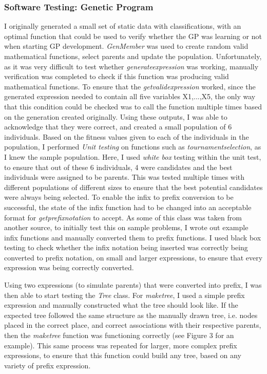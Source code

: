 \documentclass[11pt]{article}
\begin{document}
\subsubsection{Software Testing: Genetic Program}\label{subsubsec:STGP}
I originally generated a small set of static data with classifications, with an optimal function that could be used to verify whether the GP was learning or not when starting GP development.
\textit{GenMember} was used to create random valid mathematical functions, select parents and update the population. Unfortunately, as it was very difficult to test whether \textit{generate\textunderscore expression} was working, manually verification was completed to check if this function was producing valid mathematical functions. To ensure that the \textit{get\textunderscore valid\textunderscore expression} worked, since the generated expression needed to contain all five variables X1,...,X5, the only way that this condition could be checked was to call the function multiple times based on the generation created originally. Using these outputs, I was able to acknowledge that they were correct, and created a small population of 6 individuals. Based on the fitness values given to each of the individuals in the population, I performed \textit{Unit testing} on functions such as \textit{tournament\textunderscore selection}, as I knew the sample population. Here, I used \textit{white box} testing within the unit test, to ensure that out of these 6 individuals, 4 were candidates and the best individuals were assigned to be parents. This was tested multiple times with different populations of different sizes to ensure that the best potential candidates were always being selected. 
To enable the infix to prefix conversion to be successful, the state of the infix function had to be changed into an acceptable format for \textit{get\textunderscore prefix\textunderscore notation} to accept. As some of this class was taken from another source, to initially test this on sample problems, I wrote out example infix functions and manually converted them to prefix functions. I used black box testing to check whether the infix notation being inserted was correctly being converted to prefix notation, on small and larger expressions, to ensure that every expression was being correctly converted. 

Using two expressions (to simulate parents) that were converted into prefix, I was then able to start testing the \textit{Tree} class. For \textit{make\textunderscore tree}, I used a simple prefix expression
and manually constructed what the tree should look like. If the expected tree followed the same structure as the manually drawn tree, i.e. nodes placed in the correct place, and correct associations with their respective parents, then the \textit{make\textunderscore tree} function was functioning correctly (see Figure 3 for an example).  This same process was repeated for larger, more complex prefix expressions, to ensure that this function could build any tree, based on any variety of prefix expression.  
\end{document}
